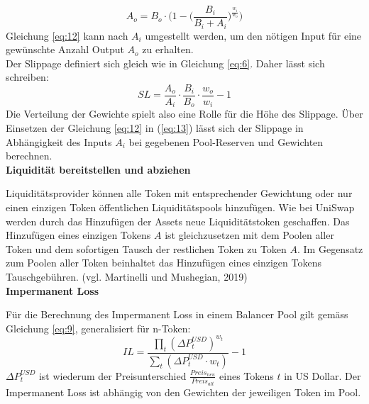 \documentclass[12pt,a4paper,titlepage,oneside,english]{article}
\begin{document}
\begin{equation}
A_{o} = B_{o} \cdot \Biggl(1-\biggl(\dfrac{B_{i}}{B_{i}+ A_{i}}\biggr)^{\tfrac{w_{i}}{w_{o}}}\Biggr) \label{eq:12} 
\end{equation}
Gleichung \ref{eq:12} kann nach $A_{i}$ umgestellt werden, um den nötigen Input für eine gewünschte Anzahl Output $A_{o}$ zu erhalten.\\
Der Slippage definiert sich gleich wie in Gleichung \ref{eq:6}. Daher lässt sich schreiben: 
\begin{equation}
SL= \dfrac{A_{o}}{A_{i}} \cdot \dfrac{B_{i}}{B_{o}} \cdot \dfrac{w_{o}}{w_{i}} -1 \label{eq:13}
\end{equation}
Die Verteilung der Gewichte spielt also eine Rolle für die Höhe des Slippage. Über Einsetzen der Gleichung \ref{eq:12} in (\ref{eq:13}) lässt sich der Slippage in Abhängigkeit des Inputs $A_{i}$ bei gegebenen Pool-Reserven und Gewichten berechnen. \\

\textbf{Liquidität bereitstellen und abziehen}

Liquiditätsprovider können alle Token mit entsprechender Gewichtung oder nur einen einzigen Token öffentlichen Liquiditätspools hinzufügen. Wie bei UniSwap werden durch das Hinzufügen der Assets neue Liquiditätstoken geschaffen. Das Hinzufügen eines einzigen Tokens $A$ ist gleichzusetzen mit dem Poolen aller Token und dem sofortigen Tausch der restlichen Token zu Token $A$. Im Gegensatz zum Poolen aller Token beinhaltet das Hinzufügen eines einzigen Tokens Tauschgebühren. (vgl. Martinelli und Mushegian, 2019) \\
\newpage
\textbf{Impermanent Loss}

Für die Berechnung des Impermanent Loss in einem Balancer Pool gilt gemäss \citet{Martinelli2020} Gleichung \ref{eq:9}, generalisiert für n-Token: 
\begin{equation}
IL = \dfrac{\prod_{t}(\Delta P^{USD}_{t})^{w_{t}}}{\sum_{t}(\Delta P^{USD}_{t} \cdot w_{t})}-1 \label{eq:14}
\end{equation}
$\Delta P^{USD}_{t}$ ist wiederum der Preisunterschied $\tfrac{Preis_{neu}}{Preis_{alt}}$ eines Tokens $t$ in US Dollar. %
Der Impermanent Loss ist abhängig von den Gewichten der jeweiligen Token im Pool. \\ %
\end{document}
